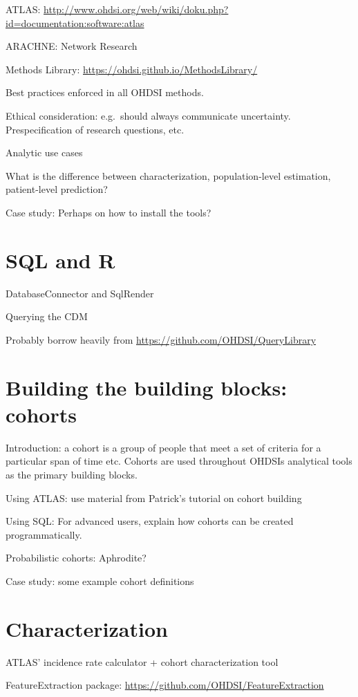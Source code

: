 \documentclass[]{book}
\begin{document}
ATLAS:
\url{http://www.ohdsi.org/web/wiki/doku.php?id=documentation:software:atlas}

ARACHNE: Network Research

Methods Library: \url{https://ohdsi.github.io/MethodsLibrary/}

Best practices enforced in all OHDSI methods.

Ethical consideration: e.g.~should always communicate uncertainty.
Prespecification of research questions, etc.

Analytic use cases

What is the difference between characterization, population-level
estimation, patient-level prediction?

Case study: Perhaps on how to install the tools?

\chapter{SQL and R}\label{SqlAndR}

DatabaseConnector and SqlRender

Querying the CDM

Probably borrow heavily from \url{https://github.com/OHDSI/QueryLibrary}

\chapter{Building the building blocks: cohorts}\label{Cohorts}

Introduction: a cohort is a group of people that meet a set of criteria
for a particular span of time etc. Cohorts are used throughout OHDSIs
analytical tools as the primary building blocks.

Using ATLAS: use material from Patrick's tutorial on cohort building

Using SQL: For advanced users, explain how cohorts can be created
programmatically.

Probabilistic cohorts: Aphrodite?

Case study: some example cohort definitions

\chapter{Characterization}\label{Characterization}

ATLAS' incidence rate calculator + cohort characterization tool

FeatureExtraction package:
\url{https://github.com/OHDSI/FeatureExtraction}
\end{document}
